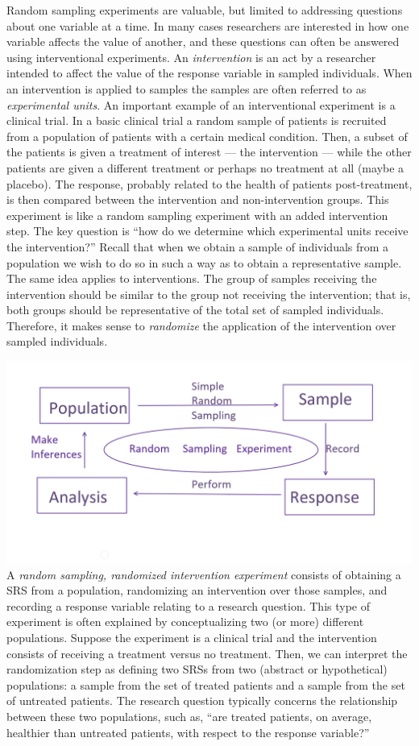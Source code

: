 \documentclass[]{book}
\begin{document}
Random sampling experiments are valuable, but limited to addressing
questions about one variable at a time. In many cases researchers are
interested in how one variable affects the value of another, and these
questions can often be answered using interventional experiments. An
\emph{intervention} is an act by a researcher intended to affect the
value of the response variable in sampled individuals. When an
intervention is applied to samples the samples are often referred to as
\emph{experimental units}. An important example of an interventional
experiment is a clinical trial. In a basic clinical trial a random
sample of patients is recruited from a population of patients with a
certain medical condition. Then, a subset of the patients is given a
treatment of interest --- the intervention --- while the other patients
are given a different treatment or perhaps no treatment at all (maybe a
placebo). The response, probably related to the health of patients
post-treatment, is then compared between the intervention and
non-intervention groups. This experiment is like a random sampling
experiment with an added intervention step. The key question is ``how do
we determine which experimental units receive the intervention?'' Recall
that when we obtain a sample of individuals from a population we wish to
do so in such a way as to obtain a representative sample. The same idea
applies to interventions. The group of samples receiving the
intervention should be similar to the group not receiving the
intervention; that is, both groups should be representative of the total
set of sampled individuals. Therefore, it makes sense to
\emph{randomize} the application of the intervention over sampled
individuals.

\includegraphics[width=23.85in]{rsediagram} A \emph{random sampling,
randomized intervention experiment} consists of obtaining a SRS from a
population, randomizing an intervention over those samples, and
recording a response variable relating to a research question. This type
of experiment is often explained by conceptualizing two (or more)
different populations. Suppose the experiment is a clinical trial and
the intervention consists of receiving a treatment versus no treatment.
Then, we can interpret the randomization step as defining two SRSs from
two (abstract or hypothetical) populations: a sample from the set of
treated patients and a sample from the set of untreated patients. The
research question typically concerns the relationship between these two
populations, such as, ``are treated patients, on average, healthier than
untreated patients, with respect to the response variable?''
\end{document}
